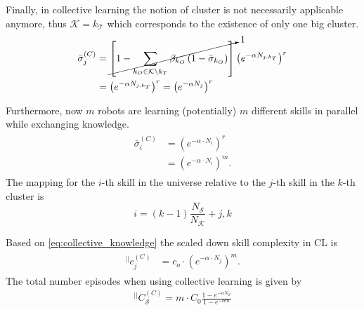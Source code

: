 Finally, in collective learning the notion of cluster is not necessarily applicable anymore, thus 
$\mathcal{K} = k_\mathcal{T}$ which corresponds to the existence of only one big cluster.
\begin{align}
	\begin{split}
		\bar{\sigma}_j^{(C)} &=   \cancelto{1}{ \left[1- \sum_{k_O \in \mathcal{K} \setminus k_T}\beta_{k_O} \left( 1 - \bar{\sigma}_{k_O} \right)\right]} \left(e^{-\alpha {N_{j,k_T}}} \right)^r \\
		&= \left(e^{-\alpha N_{j,k_T}} \right)^r  = \left(e^{-\alpha N_{j}}\right)^r 
	\end{split}
\end{align}

Furthermore, now $m$ robots are learning (potentially) $m$ different skills in parallel while exchanging knowledge.
\begin{align}\label{eq:collective_knowledge}
	\begin{split}
		\bar{\sigma}_i^{(C)} &= \left({e^{-\alpha \cdot N_i}}\right)^{r}\\
		&= \left({e^{-\alpha \cdot N_i}}\right)^{m}.
	\end{split}
\end{align}
The mapping for the $i$-th skill in the universe relative to the $j$-th skill in the $k$-th cluster is
\begin{equation}
	i = (k-1)\frac{N_\mathcal{S}}{N_\mathcal{K}} + j,k
\end{equation}

Based on \eqref{eq:collective_knowledge} the scaled down skill complexity in CL is 
\begin{align}\label{eq:collective_knowledge}
\begin{split}
	^{||}c_j^{(C)} &= c_o \cdot \left({e^{-\alpha \cdot N_j}}\right)^{m}.
\end{split}
\end{align}
The total number episodes when using collective learning is given by
\begin{eqnarray}
^{||}C_\mathcal{S}^{(C)} = m \cdot C_0 \frac{1 - e^{-\alpha N_\mathcal{S}}}{1 - e^{-\alpha m}}
\end{eqnarray}
